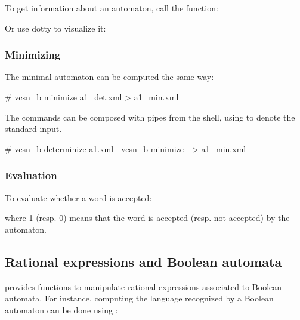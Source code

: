 
To get information about an automaton, call the  function:

Or use dotty to visualize it:
\begin{center}
\end{center}

\subsubsection{Minimizing}

The minimal automaton can be computed the same way:
\begin{shell}
# vcsn_b minimize a1_det.xml > a1_min.xml
\end{shell}

The commands can be composed with pipes from the shell, using
\Index{\samp{-}} to denote the standard input.
\begin{shell}
# vcsn_b determinize a1.xml | vcsn_b minimize - > a1_min.xml
\end{shell}


\subsubsection{Evaluation}

To evaluate whether a word is accepted:


where 1 (resp. 0) means that the word is accepted (resp. not accepted)
by the automaton.

\subsection{Rational expressions and Boolean automata}

\Vauc provides functions to manipulate rational expressions associated
to Boolean automata. For instance, computing the language recognized
by a Boolean automaton can be done using :


